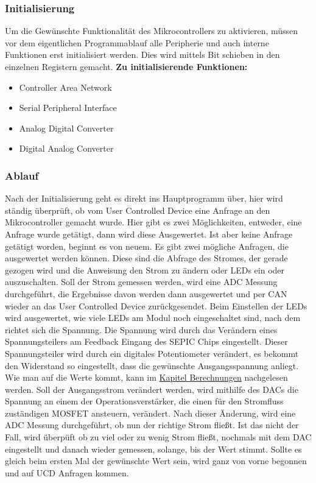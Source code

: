 \documentclass[paper=a4, 12pt]{scrreprt}
\begin{document}
		\subsubsection{Initialisierung}\hfill \break
		Um die Gewünschte Funktionalität des Mikrocontrollers zu aktivieren, müssen vor dem eigentlichen Programmablauf alle Peripherie und auch interne Funktionen erst initialisiert werden. Dies wird mittels Bit schieben in den einzelnen Registern gemacht. \hfill \break \hfill \break		
		\textbf{Zu initialisierende Funktionen:}
		\begin{itemize}
			\item Controller Area Network
			\item Serial Peripheral Interface
			\item Analog Digital Converter
			\item Digital Analog Converter
		\end{itemize}
	
		\subsubsection{Ablauf}\hfill \break
		Nach der Initialisierung geht es direkt ins Hauptprogramm über, hier wird ständig überprüft, ob vom User Controlled Device eine Anfrage an den Mikrocontroller gemacht wurde. Hier gibt es zwei Möglichkeiten, entweder, eine Anfrage wurde getätigt, dann wird diese Ausgewertet. Ist aber keine Anfrage getätigt worden, beginnt es von neuem.\hfill \break \hfill \break
		Es gibt zwei mögliche Anfragen, die ausgewertet werden können. Diese sind die Abfrage des Stromes, der gerade gezogen wird und die Anweisung den Strom zu ändern oder LEDs ein oder auszuschalten.\hfill \break \hfill \break
		Soll der Strom gemessen werden, wird eine ADC Messung durchgeführt, die Ergebnisse davon werden dann ausgewertet und per CAN wieder an das User Controlled Device zurückgesendet.\hfill \break \hfill \break
		Beim Einstellen der LEDs wird ausgewertet, wie viele LEDs am Modul noch eingeschaltet sind, nach dem richtet sich die Spannung. Die Spannung wird durch das Verändern eines Spannungsteilers am Feedback Eingang des SEPIC Chips eingestellt. Dieser Spannungsteiler wird durch ein digitales Potentiometer verändert, es bekommt den Widerstand so eingestellt, dass die gewünschte Ausgangsspannung anliegt. Wie man auf die Werte kommt, kann im \hyperref[sec:berechnungen]{Kapitel Berechnungen} nachgelesen werden.\hfill \break \hfill \break
		Soll der Ausgangsstrom verändert werden, wird mithilfe des DACs die Spannung an einem der Operationsverstärker, die einen für den Stromfluss zuständigen MOSFET ansteuern, verändert. Nach dieser Änderung, wird eine ADC Messung durchgeführt, ob nun der richtige Strom fließt. Ist das nicht der Fall, wird überpüft ob zu viel oder zu wenig Strom fließt, nochmals mit dem DAC eingestellt und danach wieder gemessen, solange, bis der Wert stimmt. Sollte es gleich beim ersten Mal der gewünschte Wert sein, wird ganz von vorne begonnen und auf UCD Anfragen kommen.
		\newpage
		
\end{document}
